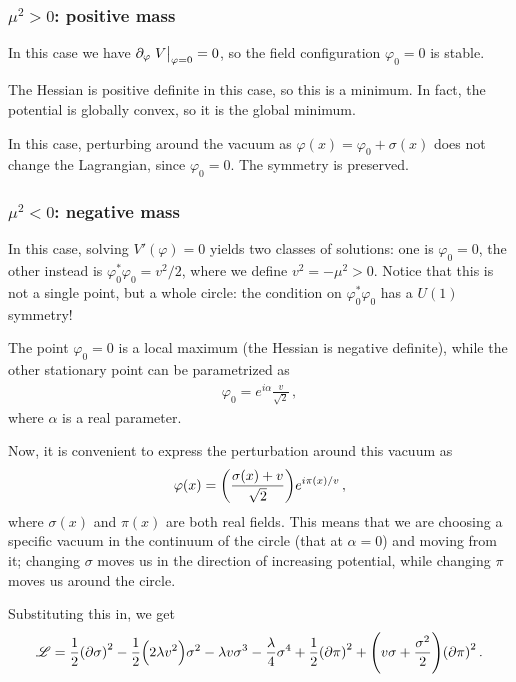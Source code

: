 \documentclass[main.tex]{subfiles}
\begin{document}
\subsubsection{\(\mu^2 > 0\): positive mass}

In this case we have \(\partial_{\varphi } \eval{V}_{\varphi =0} = 0\), so the field configuration \(\varphi_0 = 0 \) is stable. 

The Hessian is positive definite in this case, so this is a minimum. In fact, the potential is globally convex, so it is the global minimum.

In this case, perturbing around the vacuum as \(\varphi (x) = \varphi_0 + \sigma (x)\) does not change the Lagrangian, since \(\varphi_0 = 0\). The symmetry is preserved. 

\subsubsection{\(\mu^2 < 0\): negative mass}

In this case, solving \(V' (\varphi ) = 0\) yields two classes of solutions: one is \(\varphi_0 = 0\), the other instead is \(\varphi^{*}_{0} \varphi_0 = v^2 / 2\), where we define \(v^2 = - \mu^2 > 0 \). Notice that this is not a single point, but a whole circle: the condition on \(\varphi^{*}_{0} \varphi_0 \) has a \(U(1)\) symmetry!

The point \(\varphi_0 = 0\) is a local maximum (the Hessian is negative definite), while the other stationary point can be parametrized as 
%
\begin{align}
\varphi_0 = e^{i \alpha } \frac{v}{\sqrt{2}}
\,,
\end{align}
%
where \(\alpha \) is a real parameter. 

Now, it is convenient to express the perturbation around this vacuum as 
%
\begin{align}
\varphi (x) = \qty(\frac{\sigma (x) + v}{\sqrt{2}}) e^{i \pi (x) / v}
\,,
\end{align}
%
where \(\sigma (x)\) and \(\pi (x)\) are both real fields.
This means that we are choosing a specific vacuum in the continuum of the circle (that at \(\alpha = 0\)) and moving from it; changing \(\sigma \) moves us in the direction of increasing potential, while changing \(\pi \) moves us around the circle. 

Substituting this in, we get 
%
\begin{align}
\mathscr{L} = \frac{1}{2} \qty(\partial \sigma )^2 - \frac{1}{2} \qty(2 \lambda v^2) \sigma^2 - \lambda v \sigma^3 - \frac{\lambda}{4} \sigma^{4}
+ \frac{1}{2} \qty(\partial \pi )^2 + \qty(v \sigma + \frac{\sigma^2}{2}) \qty(\partial \pi )^2
\,.
\end{align}
\end{document}
